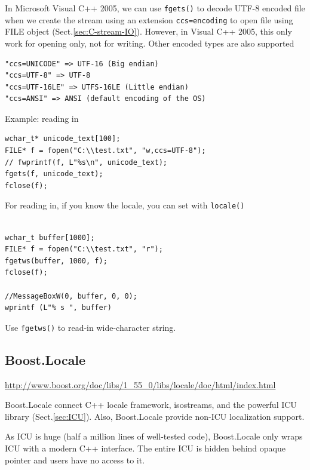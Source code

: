 In Microsoft Visual C++ 2005, we can use \verb!fgets()! to decode UTF-8 encoded
file when we create the stream using an extension \verb!ccs=encoding! to open file using
FILE object (Sect.\ref{sec:C-stream-IO}). However, in Visual C++ 2005, this only
work for opening only, not for writing. Other encoded types are also supported
\begin{verbatim}
"ccs=UNICODE" => UTF-16 (Big endian)
"ccs=UTF-8" => UTF-8
"ccs=UTF-16LE" => UTFS-16LE (Little endian) 
"ccs=ANSI" => ANSI (default encoding of the OS)
\end{verbatim}

Example: reading in
\begin{verbatim}
wchar_t* unicode_text[100];
FILE* f = fopen("C:\\test.txt", "w,ccs=UTF-8");
// fwprintf(f, L"%s\n", unicode_text);
fgets(f, unicode_text);
fclose(f);
\end{verbatim}


For reading in, if you know the locale, you can set with \verb!locale()!
\begin{verbatim}

wchar_t buffer[1000];
FILE* f = fopen("C:\\test.txt", "r");
fgetws(buffer, 1000, f);
fclose(f);

//MessageBoxW(0, buffer, 0, 0);
wprintf (L"% s ", buffer)
\end{verbatim}
Use \verb!fgetws()! to read-in wide-character string.

\subsection{Boost.Locale}
\label{sec:Boost.Locale}

\url{http://www.boost.org/doc/libs/1_55_0/libs/locale/doc/html/index.html}

Boost.Locale connect C++ locale framework, isostreams, and the powerful ICU
library (Sect.\ref{sec:ICU}). Also, Boost.Locale provide non-ICU localization
support.

As ICU is huge (half a million lines of well-tested code), Boost.Locale only
wraps ICU with a modern C++ interface. The entire ICU is hidden behind opaque
pointer and users have no access to it.
